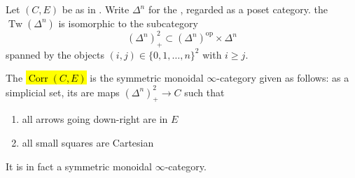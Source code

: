 \begin{definition} \label{definition:correspondence_symmetric_monoidal_infty_category_of_an_infty_category_with_finite_limtis_and_class_of_morphisms_containing_isomorphisms_and_stable_under_pulback_and_composition}
    Let $(C,E)$ be as in . 
    Write $\Delta^n$ for the , regarded as a poset category.  the  $\operatorname{Tw}(\Delta^n)$ is isomorphic to the subcategory
    $$(\Delta^n)_+^2 \subset (\Delta^n)^{\operatorname{op}} \times \Delta^n$$
    spanned by the objects $(i,j) \in \{0,1,\ldots,n\}^2$ with $i \geq j$.

    The  \hl{$\operatorname{Corr}(C,E)$} is the symmetric monoidal $\infty$-category given as follows: as a simplicial set, its  are maps $(\Delta^n)^2_+ \to C$ such that 

    \begin{enumerate}
        \item all arrows going down-right are in $E$ 
        \item all small squares are Cartesian 
    \end{enumerate}

    It is in fact a symmetric monoidal $\infty$-category.
\end{definition}